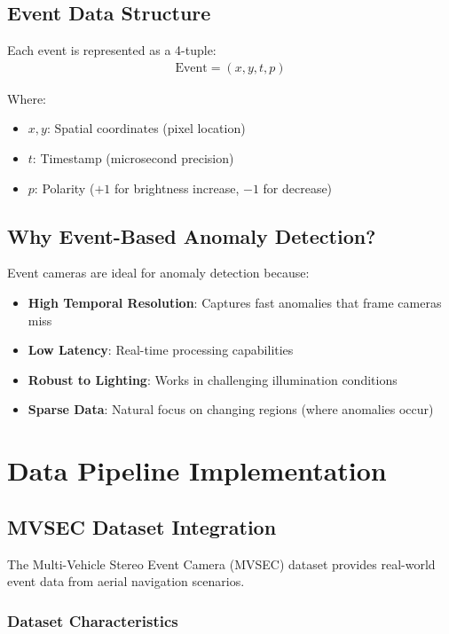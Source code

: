 \documentclass[12pt,a4paper]{article}
\begin{document}
\subsection{Event Data Structure}

Each event is represented as a 4-tuple:
\begin{align}
\text{Event} = (x, y, t, p)
\end{align}

Where:
\begin{itemize}
    \item $x, y$: Spatial coordinates (pixel location)
    \item $t$: Timestamp (microsecond precision)
    \item $p$: Polarity ($+1$ for brightness increase, $-1$ for decrease)
\end{itemize}

\subsection{Why Event-Based Anomaly Detection?}

Event cameras are ideal for anomaly detection because:
\begin{itemize}
    \item \textbf{High Temporal Resolution}: Captures fast anomalies that frame cameras miss
    \item \textbf{Low Latency}: Real-time processing capabilities
    \item \textbf{Robust to Lighting}: Works in challenging illumination conditions
    \item \textbf{Sparse Data}: Natural focus on changing regions (where anomalies occur)
\end{itemize}

\section{Data Pipeline Implementation}

\subsection{MVSEC Dataset Integration}

The Multi-Vehicle Stereo Event Camera (MVSEC) dataset provides real-world event data from aerial navigation scenarios.

\subsubsection{Dataset Characteristics}
\end{document}
